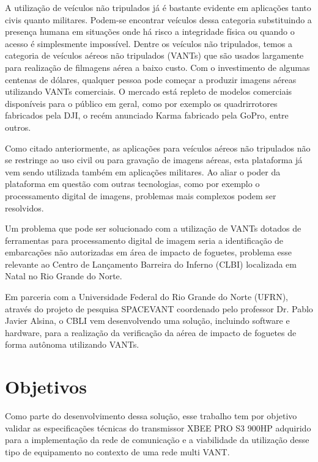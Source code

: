 \label{Cap:introducao}

A utilização de veículos não tripulados já é bastante evidente em aplicações tanto civis quanto militares. Podem-se encontrar veículos dessa categoria substituindo a presença humana em situações onde há risco a integridade física ou quando o acesso é simplesmente impossível. Dentre os veículos não tripulados, temos a categoria de veículos aéreos não tripulados (VANTs) que são usados largamente para realização de filmagens aérea a baixo custo. Com o investimento de algumas centenas de dólares, qualquer pessoa pode começar a produzir imagens aéreas utilizando VANTs comerciais. O mercado está repleto de modelos comerciais disponíveis para o público em geral, como por exemplo os quadrirrotores fabricados pela DJI, o recém anunciado Karma fabricado pela GoPro, entre outros.

Como citado anteriormente, as aplicações para veículos aéreos não tripulados não se restringe ao uso civil ou para gravação de imagens aéreas, esta plataforma já vem sendo utilizada também em aplicações militares. Ao aliar o poder da plataforma em questão com outras tecnologias, como por exemplo o processamento digital de imagens, problemas mais complexos podem ser resolvidos. 

Um problema que pode ser solucionado com a utilização de VANTs dotados de ferramentas para processamento digital de imagem seria a identificação de embarcações não autorizadas em área de impacto de foguetes, problema esse relevante ao Centro de Lançamento Barreira do Inferno (CLBI) localizada em Natal no Rio Grande do Norte. 

Em parceria com a Universidade Federal do Rio Grande do Norte (UFRN), através do projeto de pesquisa SPACEVANT coordenado pelo professor Dr. Pablo Javier Alsina, o CBLI vem desenvolvendo uma solução, incluindo software e hardware, para a realização da verificação da aérea de impacto de foguetes de forma autônoma utilizando VANTs. 

\section{Objetivos}

Como parte do desenvolvimento dessa solução, esse trabalho tem por objetivo validar as especificações técnicas do transmissor XBEE PRO S3 900HP adquirido para a implementação da rede de comunicação e a viabilidade da utilização desse tipo de equipamento no contexto de uma rede multi VANT.

